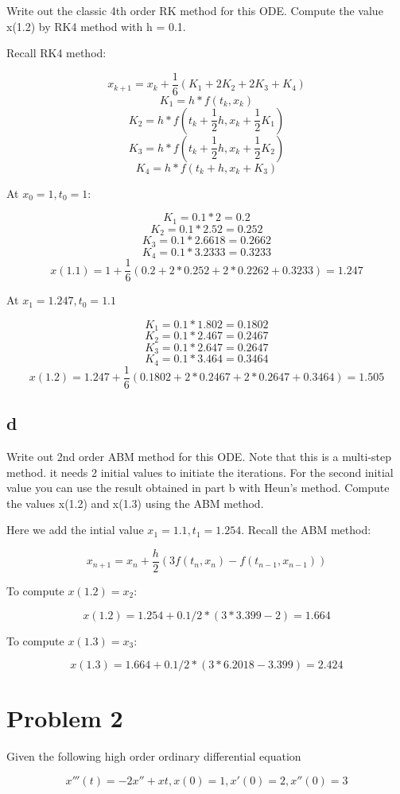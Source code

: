 \documentclass[]{article}
\begin{document}
Write out the classic 4th order RK method for this ODE. Compute the
value x(1.2) by RK4 method with h = 0.1.

Recall RK4 method:

\[x_{k+1} = x_k + \frac16(K_1 + 2K_2 + 2K_3 + K_4)\]
\[K_1 = h*f(t_k, x_k)\] \[K_2 = h*f(t_k + \frac12h, x_k + \frac12K_1)\]
\[K_3 = h*f(t_k + \frac12h, x_k + \frac12K_2)\]
\[K_4 = h*f(t_k + h, x_k + K_3)\]

At \(x_0 = 1, t_0 = 1\):

\[K_1 = 0.1 * 2 = 0.2\] \[K_2 = 0.1 * 2.52 = 0.252 \]
\[K_3 = 0.1 * 2.6618 = 0.2662\] \[K_4 = 0.1 * 3.2333 = 0.3233\]
\[x(1.1) = 1 + \frac16(0.2 + 2 * 0.252 + 2 * 0.2262 + 0.3233) = 1.247\]

At \(x_1 = 1.247, t_0 = 1.1\)

\[K_1 = 0.1 * 1.802 = 0.1802\] \[K_2 = 0.1 * 2.467 = 0.2467\]
\[K_3 = 0.1 * 2.647 = 0.2647\] \[K_4 = 0.1 * 3.464 = 0.3464\]
\[x(1.2) = 1.247 + \frac16(0.1802 + 2 * 0.2467 + 2 * 0.2647 + 0.3464) = 1.505\]

\subsection{d}\label{d}

Write out 2nd order ABM method for this ODE. Note that this is a
multi-step method. it needs 2 initial values to initiate the iterations.
For the second initial value you can use the result obtained in part b
with Heun's method. Compute the values x(1.2) and x(1.3) using the ABM
method.

Here we add the intial value \(x_1 = 1.1, t_1 = 1.254\). Recall the ABM
method:

\[x_{n+1} = x_n + \frac{h}2(3f(t_n,x_n) - f(t_{n-1}, x_{n-1}))\]

To compute \(x(1.2) = x_2\):

\[x(1.2) = 1.254 + 0.1/ 2 * (3*3.399 - 2) = 1.664\]

To compute \(x(1.3) = x_3\):

\[x(1.3) = 1.664 + 0.1/2 *(3*6.2018 - 3.399) = 2.424\]

\section{Problem 2}\label{problem-2}

Given the following high order ordinary differential equation

\[x'''(t) = -2x'' + xt, x(0) = 1, x'(0) = 2, x''(0) = 3\]
\end{document}
